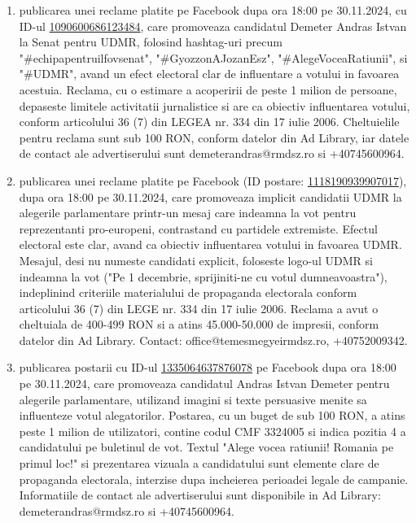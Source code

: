 \documentclass[a4paper,12pt]{article}
\begin{document}
\begin{enumerate}[leftmargin=*, label=\arabic*.)]
    \item publicarea unei reclame platite pe Facebook dupa ora 18:00 pe 30.11.2024, cu ID-ul \href{https://www.facebook.com/ads/library/?id=1090600686123484}{1090600686123484}, care promoveaza candidatul Demeter Andras Istvan la Senat pentru UDMR, folosind hashtag-uri precum "\#echipapentruilfovsenat", "\#GyozzonAJozanEsz", "\#AlegeVoceaRatiunii", si "\#UDMR", avand un efect electoral clar de influentare a votului in favoarea acestuia. Reclama, cu o estimare a acoperirii de peste 1 milion de persoane, depaseste limitele activitatii jurnalistice si are ca obiectiv influentarea votului, conform articolului 36 (7) din LEGEA nr. 334 din 17 iulie 2006.  Cheltuielile pentru reclama sunt sub 100 RON, conform datelor din Ad Library, iar datele de contact ale advertiserului sunt demeterandras@rmdsz.ro si +40745600964.
    \item publicarea unei reclame platite pe Facebook (ID postare: \href{https://www.facebook.com/ads/library/?id=1118190939907017}{1118190939907017}), dupa ora 18:00 pe 30.11.2024, care promoveaza implicit candidatii UDMR la alegerile parlamentare printr-un mesaj care indeamna la vot pentru reprezentanti pro-europeni, contrastand cu partidele extremiste.  Efectul electoral este clar, avand ca obiectiv influentarea votului in favoarea UDMR.  Mesajul, desi nu numeste candidati explicit,  foloseste logo-ul UDMR si indeamna la vot ("Pe 1 decembrie, sprijiniti-ne cu votul dumneavoastra"), indeplinind criteriile materialului de propaganda electorala conform articolului 36 (7) din LEGE nr. 334 din 17 iulie 2006.  Reclama a avut o cheltuiala de 400-499 RON si a atins 45.000-50.000 de impresii, conform datelor din Ad Library.  Contact: office@temesmegyeirmdsz.ro, +40752009342.
    \item publicarea postarii cu ID-ul \href{https://www.facebook.com/ads/library/?id=1335064637876078}{1335064637876078} pe Facebook dupa ora 18:00 pe 30.11.2024, care promoveaza candidatul Andras Istvan Demeter pentru alegerile parlamentare,  utilizand imagini si texte persuasive menite sa influenteze votul alegatorilor. Postarea, cu un buget de sub 100 RON, a atins peste 1 milion de utilizatori, contine codul CMF 3324005 si indica pozitia 4 a candidatului pe buletinul de vot.  Textul "Alege vocea ratiunii! Romania pe primul loc!" si prezentarea vizuala a candidatului sunt elemente clare de propaganda electorala, interzise dupa incheierea perioadei legale de campanie.  Informatiile de contact ale advertiserului sunt disponibile in Ad Library: demeterandras@rmdsz.ro si +40745600964.

\end{enumerate}
\end{document}
